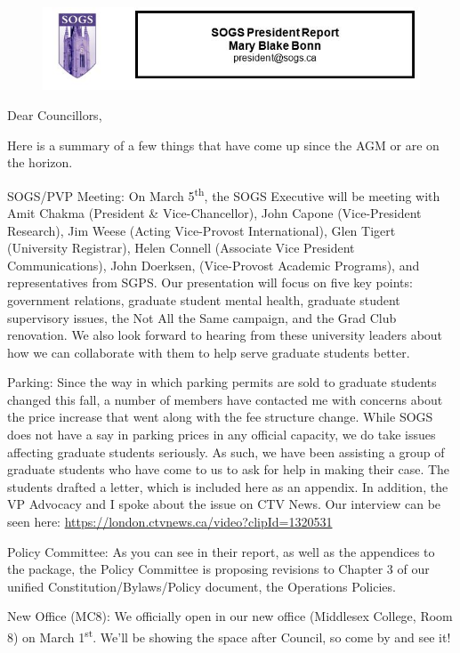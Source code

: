 
\begin{figure}%
    \centering
    \href{mailto:president@sogs.ca}{\includegraphics[scale=1]{President.JPG}}
\end{figure}

Dear Councillors,

Here is a summary of a few things that have come up since the AGM or are
on the horizon.

SOGS/PVP Meeting: On March 5\textsuperscript{th}, the SOGS Executive
will be meeting with Amit Chakma (President \& Vice-Chancellor), John
Capone (Vice-President Research), Jim Weese (Acting Vice-Provost
International), Glen Tigert (University Registrar), Helen Connell
(Associate Vice President Communications), John Doerksen, (Vice-Provost
Academic Programs), and \linebreak representatives from SGPS. Our presentation will
focus on five key points: government relations, graduate student mental
health, graduate student supervisory issues, the Not All the Same
campaign, and the Grad Club renovation. We also look forward to hearing
from these university leaders about how we can collaborate with them to
help serve graduate students better.


Parking: Since the way in which parking permits are sold to graduate
students changed this fall, a number of members have contacted me with
concerns about the price increase that went along with the fee structure
change. While SOGS does not have a say in parking prices in any official
capacity, we do take issues affecting graduate students seriously. As
such, we have been assisting a group of graduate students who have come
to us to ask for help in making their case. The students drafted a
letter, which is included here as an appendix. In addition, the VP
Advocacy and I spoke about the issue on CTV News. Our interview can be
seen here: \url{https://london.ctvnews.ca/video?clipId=1320531}


Policy Committee: As you can see in their report, as well as the
appendices to the package, the Policy Committee is proposing revisions
to Chapter 3 of our unified Constitution/Bylaws/Policy document, the
Operations Policies.


New Office (MC8): We officially open in our new office (Middlesex
College, Room 8) on March 1\textsuperscript{st}. We'll be showing the
space after Council, so come by and see it!


